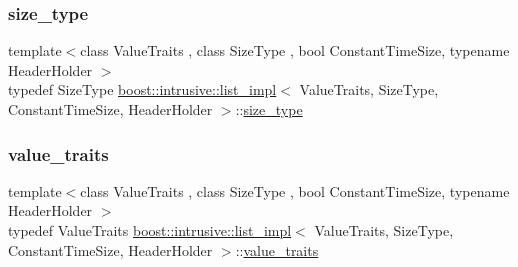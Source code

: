\mbox{\label{classboost_1_1intrusive_1_1list__impl_a3e340b93081e392fba09de7145fb5733}} 
\subsubsection{\texorpdfstring{size\+\_\+type}{size\_type}}
{\footnotesize\ttfamily template$<$class Value\+Traits , class Size\+Type , bool Constant\+Time\+Size, typename Header\+Holder $>$ \\
typedef Size\+Type \hyperlink{classboost_1_1intrusive_1_1list__impl}{boost\+::intrusive\+::list\+\_\+impl}$<$ Value\+Traits, Size\+Type, Constant\+Time\+Size, Header\+Holder $>$\+::\hyperlink{classboost_1_1intrusive_1_1list__impl_a3e340b93081e392fba09de7145fb5733}{size\+\_\+type}}

\mbox{\label{classboost_1_1intrusive_1_1list__impl_a5cd55672f6df367749d91ef708834126}} 
\subsubsection{\texorpdfstring{value\+\_\+traits}{value\_traits}}
{\footnotesize\ttfamily template$<$class Value\+Traits , class Size\+Type , bool Constant\+Time\+Size, typename Header\+Holder $>$ \\
typedef Value\+Traits \hyperlink{classboost_1_1intrusive_1_1list__impl}{boost\+::intrusive\+::list\+\_\+impl}$<$ Value\+Traits, Size\+Type, Constant\+Time\+Size, Header\+Holder $>$\+::\hyperlink{classboost_1_1intrusive_1_1list__impl_a5cd55672f6df367749d91ef708834126}{value\+\_\+traits}}

\mbox{\label{classboost_1_1intrusive_1_1list__impl_a011b08f2310cd73b4691870fc22e2cec}} 

